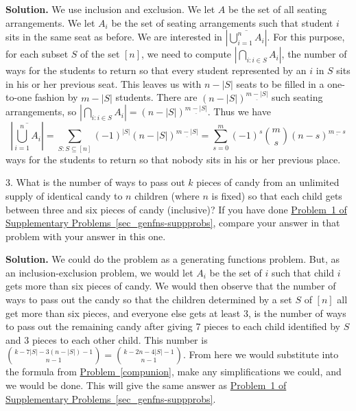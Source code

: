 \documentclass[10pt,]{book}
\theoremstyle{plain}
\theoremstyle{definition}
\theoremstyle{definition}
\numberwithin{equation}{chapter}
\begin{document}
\begin{exerciselist}
\noindent\textbf{Solution.}\hypertarget{solution-404}{}\quad
We use inclusion and exclusion. We let \(A\) be the set of all seating arrangements. We let \(A_i\) be the set of seating arrangements such that student \(i\) sits in the same seat as before. We are interested in \(\left|\overline{\bigcup_{i=1}^n A_i}\right|\). For this purpose, for each subset \(S\) of the set \([n]\), we need to compute \(\left|\bigcap_{i\colon i\in S} A_i\right|\), the number of ways for the students to return so that every student represented by an \(i\) in \(S\) sits in his or her previous seat. This leaves us with \(n-|S|\) seats to be filled in a one-to-one fashion by \(m-|S|\) students. There are \((n-|S|)^{\underline{m-|S|}}\) such seating arrangements, so \(\left|\bigcap_{i\colon i\in S} A_i\right|= (n-|S|)^{\underline{m-|S|}}\). Thus we have%
\begin{equation*}
\left|\overline{\bigcup_{i=1}^n A_i}\right|=\sum_{S:S\subseteq [n]}
(-1)^{|S|}(n-|S|)^{\underline{m-|S|}} = \sum_{s=0}^m (-1)^s\binom{m}{s}(n-s)^{\underline{m-s}}
\end{equation*}
ways for the students to return so that nobody sits in his or her previous place.%
\item[3.]\hypertarget{exercise-48}{}What is the number of ways to pass out \(k\) pieces of candy from an unlimited supply of identical candy to \(n\) children (where \(n\) is fixed) so that each child gets between three and six pieces of candy (inclusive)? If you have done \hyperlink{candy-genfn}{Problem~1 of Supplementary Problems~\ref{sec_genfns-suppprobs}}, compare your answer in that problem with your answer in this one.%
\par\smallskip
\par\smallskip
\noindent\textbf{Solution.}\hypertarget{solution-405}{}\quad
We could do the problem as a generating functions problem. But, as an inclusion-exclusion problem, we would let \(A_i\) be the set of \(i\) such that child \(i\) gets more than six pieces of candy. We would then observe that the number of ways to pass out the candy so that the children determined by a set \(S\) of \([n]\) all get more than six pieces, and everyone else gets at least 3, is the number of ways to pass out the remaining candy after giving 7 pieces to each child identified by \(S\) and 3 pieces to each other child. This number is \(\binom{k-7|S|-3(n-|S|)-1}{n-1}=\binom{k-2n-4|S|-1}{n-1}\). From here we would substitute into the formula from \hyperref[compunion]{Problem~\ref{compunion}}, make any simplifications we could, and we would be done. This will give the same answer as \hyperlink{candy-genfn}{Problem~1 of Supplementary Problems~\ref{sec_genfns-suppprobs}}.%

\end{exerciselist}
\end{document}
